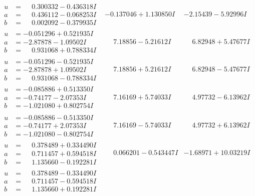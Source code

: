\documentclass[1p]{elsarticle_modified}
\theoremstyle{definition}
\begin{document}
$$\begin{array}{c|c|c}
\begin{aligned}
u &= \phantom{-}0.300332 - 0.436318 I \\
a &= \phantom{-}0.436112 - 0.068253 I \\
b &= \phantom{-}0.002092 - 0.379935 I\end{aligned}
 & -0.137046 + 1.130850 I & -2.15439 - 5.92996 I \\ \hline\begin{aligned}
u &= -0.051296 + 0.521935 I \\
a &= -2.87878 - 1.09502 I \\
b &= \phantom{-}0.931068 + 0.788334 I\end{aligned}
 & \phantom{-}7.18856 - 5.21612 I & \phantom{-}6.82948 + 5.47677 I \\ \hline\begin{aligned}
u &= -0.051296 - 0.521935 I \\
a &= -2.87878 + 1.09502 I \\
b &= \phantom{-}0.931068 - 0.788334 I\end{aligned}
 & \phantom{-}7.18856 + 5.21612 I & \phantom{-}6.82948 - 5.47677 I \\ \hline\begin{aligned}
u &= -0.085886 + 0.513350 I \\
a &= -0.74177 - 2.07353 I \\
b &= -1.021080 + 0.802754 I\end{aligned}
 & \phantom{-}7.16169 + 5.74033 I & \phantom{-}4.97732 - 6.13962 I \\ \hline\begin{aligned}
u &= -0.085886 - 0.513350 I \\
a &= -0.74177 + 2.07353 I \\
b &= -1.021080 - 0.802754 I\end{aligned}
 & \phantom{-}7.16169 - 5.74033 I & \phantom{-}4.97732 + 6.13962 I \\ \hline\begin{aligned}
u &= \phantom{-}0.378489 + 0.334490 I \\
a &= \phantom{-}0.711457 + 0.594518 I \\
b &= \phantom{-}1.135660 - 0.192281 I\end{aligned}
 & \phantom{-}0.066201 - 0.543447 I & -1.68971 + 10.03219 I \\ \hline\begin{aligned}
u &= \phantom{-}0.378489 - 0.334490 I \\
a &= \phantom{-}0.711457 - 0.594518 I \\
b &= \phantom{-}1.135660 + 0.192281 I\end{aligned}

\end{array}$$
\end{document}
